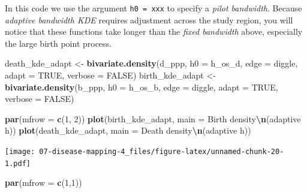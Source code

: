 \documentclass[
]{book}
\newenvironment{Shaded}{\begin{snugshade}}{\end{snugshade}}
\newcommand{\AttributeTok}[1]{\textcolor[rgb]{0.13,0.29,0.53}{#1}}
\newcommand{\ConstantTok}[1]{\textcolor[rgb]{0.56,0.35,0.01}{#1}}
\newcommand{\DecValTok}[1]{\textcolor[rgb]{0.00,0.00,0.81}{#1}}
\newcommand{\FunctionTok}[1]{\textcolor[rgb]{0.13,0.29,0.53}{\textbf{#1}}}
\newcommand{\NormalTok}[1]{#1}
\newcommand{\OtherTok}[1]{\textcolor[rgb]{0.56,0.35,0.01}{#1}}
\newcommand{\SpecialCharTok}[1]{\textcolor[rgb]{0.81,0.36,0.00}{\textbf{#1}}}
\newcommand{\StringTok}[1]{\textcolor[rgb]{0.31,0.60,0.02}{#1}}
\begin{document}
In this code we use the argument \texttt{h0\ =\ xxx} to specify a \emph{pilot bandwidth}. Because \emph{adaptive bandwidth KDE} requires adjustment across the study region, you will notice that these functions take longer than the \emph{fixed bandwidth} above, especially the large birth point process.

\begin{Shaded}
\begin{Highlighting}[]
\NormalTok{death\_kde\_adapt }\OtherTok{\textless{}{-}} \FunctionTok{bivariate.density}\NormalTok{(d\_ppp, }
                                     \AttributeTok{h0 =}\NormalTok{ h\_os\_d, }
                                     \AttributeTok{edge =} \StringTok{\textquotesingle{}diggle\textquotesingle{}}\NormalTok{, }
                                     \AttributeTok{adapt =} \ConstantTok{TRUE}\NormalTok{,}
                                     \AttributeTok{verbose =} \ConstantTok{FALSE}\NormalTok{)}
\NormalTok{birth\_kde\_adapt }\OtherTok{\textless{}{-}} \FunctionTok{bivariate.density}\NormalTok{(b\_ppp, }
                                     \AttributeTok{h0 =}\NormalTok{ h\_os\_b, }
                                     \AttributeTok{edge =} \StringTok{\textquotesingle{}diggle\textquotesingle{}}\NormalTok{,}
                                     \AttributeTok{adapt =} \ConstantTok{TRUE}\NormalTok{,}
                                     \AttributeTok{verbose =} \ConstantTok{FALSE}\NormalTok{)}
\end{Highlighting}
\end{Shaded}

\begin{Shaded}
\begin{Highlighting}[]
\FunctionTok{par}\NormalTok{(}\AttributeTok{mfrow =} \FunctionTok{c}\NormalTok{(}\DecValTok{1}\NormalTok{, }\DecValTok{2}\NormalTok{))}
\FunctionTok{plot}\NormalTok{(birth\_kde\_adapt, }\AttributeTok{main =} \StringTok{\textquotesingle{}Birth density}\SpecialCharTok{\textbackslash{}n}\StringTok{(adaptive h)\textquotesingle{}}\NormalTok{)}
\FunctionTok{plot}\NormalTok{(death\_kde\_adapt, }\AttributeTok{main =} \StringTok{\textquotesingle{}Death density}\SpecialCharTok{\textbackslash{}n}\StringTok{(adaptive h)\textquotesingle{}}\NormalTok{)}
\end{Highlighting}
\end{Shaded}

\texttt{[image: 07-disease-mapping-4\_files/figure-latex/unnamed-chunk-20-1.pdf]}

\begin{Shaded}
\begin{Highlighting}[]
\FunctionTok{par}\NormalTok{(}\AttributeTok{mfrow =} \FunctionTok{c}\NormalTok{(}\DecValTok{1}\NormalTok{,}\DecValTok{1}\NormalTok{))}
\end{Highlighting}
\end{Shaded}
\end{document}
